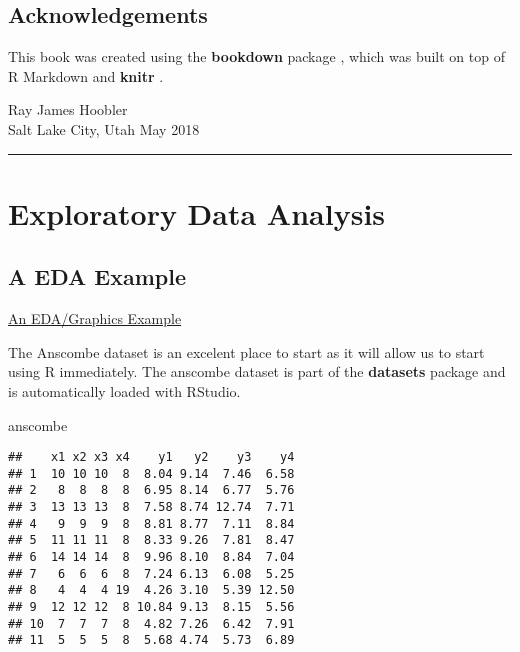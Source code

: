 \documentclass[]{book}
\newenvironment{Shaded}{\begin{snugshade}}{\end{snugshade}}
\newcommand{\NormalTok}[1]{#1}
\theoremstyle{definition}
\theoremstyle{definition}
\theoremstyle{definition}
\theoremstyle{remark}
\begin{document}
\hypertarget{acknowledgements}{%
\section*{Acknowledgements}\label{acknowledgements}}

This book was created using the \textbf{bookdown} package
\citep{R-bookdown}, which was built on top of R Markdown and
\textbf{knitr} \citep{xie2015}.

Ray James Hoobler\\
Salt Lake City, Utah May 2018

\begin{center}\rule{0.5\linewidth}{\linethickness}\end{center}

\hypertarget{EDA}{%
\chapter{Exploratory Data Analysis}\label{EDA}}

\hypertarget{a-eda-example}{%
\section{A EDA Example}\label{a-eda-example}}

\href{https://www.itl.nist.gov/div898/handbook/eda/section1/eda16.htm}{An
EDA/Graphics Example}

The Anscombe dataset is an excelent place to start as it will allow us
to start using R immediately. The anscombe dataset is part of the
\textbf{datasets} package and is automatically loaded with RStudio.

\begin{Shaded}
\begin{Highlighting}[]
\NormalTok{anscombe}
\end{Highlighting}
\end{Shaded}

\begin{verbatim}
##    x1 x2 x3 x4    y1   y2    y3    y4
## 1  10 10 10  8  8.04 9.14  7.46  6.58
## 2   8  8  8  8  6.95 8.14  6.77  5.76
## 3  13 13 13  8  7.58 8.74 12.74  7.71
## 4   9  9  9  8  8.81 8.77  7.11  8.84
## 5  11 11 11  8  8.33 9.26  7.81  8.47
## 6  14 14 14  8  9.96 8.10  8.84  7.04
## 7   6  6  6  8  7.24 6.13  6.08  5.25
## 8   4  4  4 19  4.26 3.10  5.39 12.50
## 9  12 12 12  8 10.84 9.13  8.15  5.56
## 10  7  7  7  8  4.82 7.26  6.42  7.91
## 11  5  5  5  8  5.68 4.74  5.73  6.89
\end{verbatim}
\end{document}
